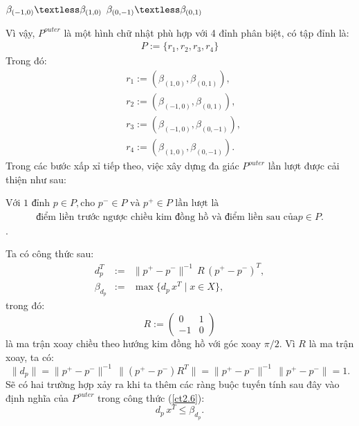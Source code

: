 \documentclass[12pt,a4paper,openany,oneside]{report}
\begin{document}
\begin{center}
	$\beta_{(-1, 0)} \textless \beta_{(1, 0)}$  $\beta_{(0, -1)} \textless \beta_{(0, 1)}$
\end{center}
Vì vậy, ${P}^{outer}$ là một hình chữ nhật phù hợp với 4 đỉnh phân biệt, có tập đỉnh là:
\begin{align}\label{ct2.9}
	P := \{r_1, r_2, r_3, r_4\}
\end{align}
Trong đó:
\begin{equation}\label{ct2.10}
	\begin{aligned}
		& r_1:=\left(\beta_{(1,0)}, \beta_{(0,1)}\right), \\
		& r_2:=\left(\beta_{(-1,0)}, \beta_{(0,1)}\right), \\
		& r_3:=\left(\beta_{(-1,0)}, \beta_{(0,-1)}\right), \\
		& r_4:=\left(\beta_{(1,0)}, \beta_{(0,-1)}\right) .
	\end{aligned}
\end{equation}
Trong các bước xấp xỉ tiếp theo, việc xây dựng đa giác ${P}^{outer}$ lần lượt được cải thiện như sau:

$\text{Với 1 đỉnh }p \in P, \text{cho } p^{-} \in P \text{ và } p^{+} \in P \text{ lần lượt là}$
\begin{align} \label{ct2.11}
\text {điểm liền trước ngược chiều kim đồng hồ và điểm liền sau của} p \in P.
\end{align}. 


Ta có công thức sau:
\begin{equation}\label{def_d_p}
	\begin{array}{lcl}
		d_{p}^T &:=& \|p^+ - p^-\|^{-1}\, R \, (p^+ - p^-)^T, \\
		\beta_{d_{p}} &:=& \max\{d_{p}\, x^T \mid x \in X\},
	\end{array}
\end{equation}
trong đó:
\begin{equation}\label{rotationmatrix}
	R := \begin{pmatrix}
		0 & 1 \\
		-1 & 0
	\end{pmatrix}
\end{equation}
là ma trận xoay chiều theo hướng kim đồng hồ với góc xoay $\pi/2$. Vì $R$ là ma trận xoay, ta có:
\begin{equation}\label{def_d_p1}
	\|d_{p}\| = \|p^+ - p^-\|^{-1}\, \|(p^+ - p^-) R^T\| = \|p^+ - p^-\|^{-1}\, \|p^+ - p^-\| = 1.
\end{equation}
Sẽ có hai trường hợp xảy ra khi ta thêm các ràng buộc tuyến tính sau đây vào định nghĩa của ${P}^{outer}$ trong công thức (\ref{ct2.6}):
\begin{equation}\label{linearconstr}
	d_p\, x^T \leq \beta_{d_p}.
\end{equation}
\end{document}
